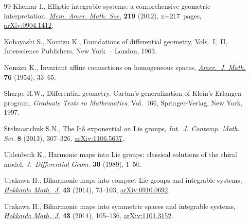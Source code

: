 \documentclass[10pt,a4paper]{amsart}
\numberwithin{equation}{section}
\begin{document}
\begin{thebibliography}{99}
Khemar I., Elliptic integrable systems: a comprehensive geometric
  interpretation, \href{http://dx.doi.org/10.1090/S0065-9266-2012-00651-4}{\textit{Mem. Amer. Math. Soc.}} \textbf{219} (2012), x+217~pages,
  \href{http://arxiv.org/abs/0904.1412}{arXiv:0904.1412}.

Kobayashi S., Nomizu K., Foundations of dif\/ferential geometry,
  {V}ols.~{I},~{II}, Interscience Publishers, New York~-- London, 1963.

Nomizu K., Invariant af\/f\/ine connections on homogeneous spaces, \href{http://dx.doi.org/10.2307/2372398}{\textit{Amer.~J.
  Math.}} \textbf{76} (1954), 33--65.

Sharpe R.W., Dif\/ferential geometry. Cartan's generalization of Klein's Erlangen
  program, \textit{Graduate Texts in Mathematics}, Vol.~166, Springer-Verlag,
  New York, 1997.

Stelmastchuk S.N., The {I}t\^o exponential on {L}ie groups, \textit{Int.~J.
  Contemp. Math. Sci.} \textbf{8} (2013), 307--326, \href{http://arxiv.org/abs/1106.5637}{arXiv:1106.5637}.

Uhlenbeck K., Harmonic maps into {L}ie groups: classical solutions of the
  chiral model, \textit{J.~Differential Geom.} \textbf{30} (1989), 1--50.

Urakawa H., Biharmonic maps into compact {L}ie groups and integrable systems,
  \href{http://dx.doi.org/10.14492/hokmj/1392906095}{\textit{Hokkaido Math.~J.}} \textbf{43} (2014), 73--103, \href{http://arxiv.org/abs/0910.0692}{arXiv:0910.0692}.

Urakawa H., Biharmonic maps into symmetric spaces and integrable systems,
  \href{http://dx.doi.org/10.14492/hokmj/1392906096}{\textit{Hokkaido Math.~J.}} \textbf{43} (2014), 105--136, \href{http://arxiv.org/abs/1101.3152}{arXiv:1101.3152}.

\end{thebibliography}
\end{document}
